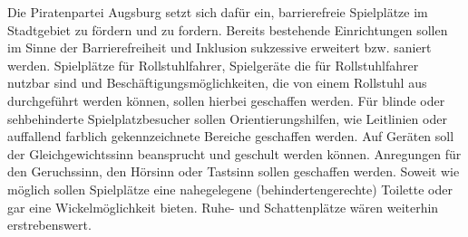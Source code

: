  Die Piratenpartei Augsburg setzt sich dafür ein, barrierefreie Spielplätze 
  im Stadtgebiet zu fördern und zu fordern. Bereits bestehende Einrichtungen 
  sollen im Sinne der Barrierefreiheit und Inklusion sukzessive erweitert bzw. 
  saniert werden. Spielplätze für Rollstuhlfahrer, Spielgeräte die für 
  Rollstuhlfahrer nutzbar sind und Beschäftigungsmöglichkeiten, die von einem 
  Rollstuhl aus durchgeführt werden können, sollen hierbei geschaffen werden. 
  Für blinde oder sehbehinderte Spielplatzbesucher sollen Orientierungshilfen, 
  wie Leitlinien oder auffallend farblich gekennzeichnete Bereiche geschaffen 
  werden. Auf Geräten soll der Gleichgewichtssinn beansprucht und geschult 
  werden können. Anregungen für den Geruchssinn, den Hörsinn oder Tastsinn 
  sollen geschaffen werden. Soweit wie möglich sollen Spielplätze eine 
  nahegelegene (behindertengerechte) Toilette oder gar eine Wickelmöglichkeit 
  bieten. Ruhe- und Schattenplätze wären weiterhin erstrebenswert.